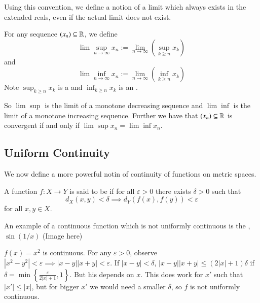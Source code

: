 Using this convention, we define a notion of a limit which always exists in the extended reals, even if the actual limit does not exist.

\begin{defn}
    For any sequence $(x_n) \subseteq \mathbb R$, we define \begin{equation*}
        \lim\sup\limits_{n\rightarrow \infty}x_n := \lim\limits_{n\rightarrow \infty}\left(\sup_{k\geq n}x_k\right) 
    \end{equation*}
    and \begin{equation*}
        \lim\inf\limits_{n\rightarrow \infty}x_n := \lim\limits_{n\rightarrow \infty}\left(\inf_{k\geq n}x_k\right) 
    \end{equation*}
    Note $\sup_{k\geq n}x_k$ is a  and $\inf_{k\geq n}x_k$ is an .
\end{defn}
So $\lim\sup$ is the limit of a monotone decreasing sequence and $\lim\inf$ is the limit of a monotone increasing sequence. Further we have that $(x_n) \subseteq \mathbb R$ is convergent if and only if $\lim\sup x_n = \lim\inf x_n$.

\subsection{Uniform Continuity}


We now define a more powerful notin of continuity of functions on metric spaces.

\begin{defn}
    A function $f:X\rightarrow Y$ is said to be  if for all $\varepsilon > 0$ there exists $\delta > 0$ such that $$d_X(x,y) < \delta \implies d_Y(f(x),f(y)) < \varepsilon$$ for all $x,y \in X$.
\end{defn}

\begin{eg}
    An example of a continuous function which is not uniformly continuous is the , $\sin(1/x)$ (Image here)
\end{eg}

\begin{eg}
    $f(x) = x^2$ is continuous. For any $\varepsilon > 0$, observe $|x^2 - y^2| < \varepsilon \implies |x-y||x+y| < \varepsilon$. If $|x-y| < \delta$, $|x-y||x+y| \leq (2|x|+1)\delta$ if $\delta = \min\left\{\frac{\varepsilon}{2|x|+1},1\right\}$. But his depends on $x$. This does work for $x'$ such that $|x'| \leq |x|$, but for bigger $x'$ we would need a smaller $\delta$, so $f$ is not uniformly continuous.
\end{eg}


